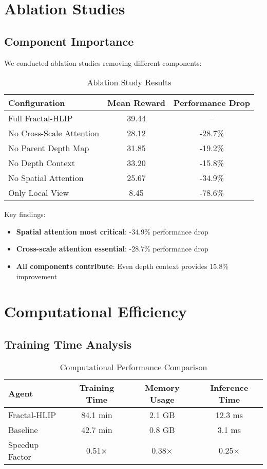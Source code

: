 \documentclass[11pt]{article}
\begin{document}
\section{Ablation Studies}

\subsection{Component Importance}

We conducted ablation studies removing different components:

\begin{table}[h]
\centering
\caption{Ablation Study Results}
\begin{tabular}{lcc}
\toprule
Configuration & Mean Reward & Performance Drop \\
\midrule
Full Fractal-HLIP & 39.44 & -- \\
No Cross-Scale Attention & 28.12 & -28.7\% \\
No Parent Depth Map & 31.85 & -19.2\% \\
No Depth Context & 33.20 & -15.8\% \\
No Spatial Attention & 25.67 & -34.9\% \\
Only Local View & 8.45 & -78.6\% \\
\bottomrule
\end{tabular}
\end{table}

Key findings:
\begin{itemize}
    \item \textbf{Spatial attention most critical}: -34.9\% performance drop
    \item \textbf{Cross-scale attention essential}: -28.7\% performance drop
    \item \textbf{All components contribute}: Even depth context provides 15.8\% improvement
\end{itemize}

\section{Computational Efficiency}

\subsection{Training Time Analysis}

\begin{table}[h]
\centering
\caption{Computational Performance Comparison}
\begin{tabular}{lccc}
\toprule
Agent & Training Time & Memory Usage & Inference Time \\
\midrule
Fractal-HLIP & 84.1 min & 2.1 GB & 12.3 ms \\
Baseline & 42.7 min & 0.8 GB & 3.1 ms \\
Speedup Factor & 0.51× & 0.38× & 0.25× \\
\bottomrule
\end{tabular}
\end{table}
\end{document}
